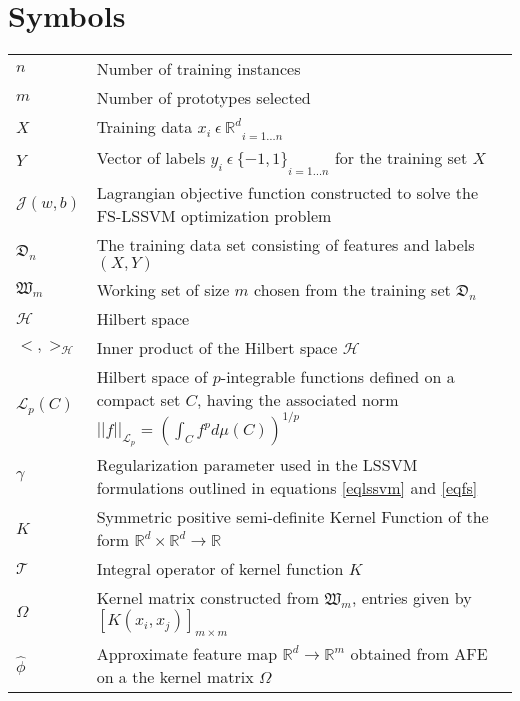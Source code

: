 \documentclass[master=mai,masteroption=ecs]{kulemt}
\begin{document}
\section*{Symbols}
\begin{flushleft}
  \renewcommand{\arraystretch}{1.1}
  \begin{tabularx}{\textwidth}{@{}p{12mm}X@{}}
    $n$ & Number of training instances\\
    $m$ & Number of prototypes selected\\
    $X $   & Training data ${x_i \ \epsilon \ \mathbb{R}^d}_{i = 1 \hdots n}$ \\
    $Y$   & Vector of labels ${y_i \ \epsilon \ \{-1, 1\}}_{i = 1 \hdots n}$ for the training set $X$ \\
    $\mathcal{J}(w,b)$ & Lagrangian objective function constructed to solve the FS-LSSVM optimization problem\\
    $\mathfrak{D}_n$ & The training data set consisting of features and labels $(X, Y)$\\
    $\mathfrak{W}_m$ & Working set of size $m$ chosen from the training set $\mathfrak{D}_n$\\
    $\mathcal{H}$ & Hilbert space\\
    $<,>_{\mathcal{H}}$ & Inner product of the Hilbert space $\mathcal{H}$\\
    $\mathcal{L}_p(C)$ & Hilbert space of $p$-integrable functions defined on a compact set $C$, having the associated norm $||f||_{\mathcal{L}_p} = (\int_{C}f^{p}d\mu(C))^{1/p}$\\
    $\gamma$ & Regularization parameter used in the LSSVM formulations outlined in equations \eqref{eqlssvm} and \eqref{eqfs}\\
    $K$ & Symmetric positive semi-definite Kernel Function of the form $\mathbb{R}^d \times \mathbb{R}^d \longrightarrow \mathbb{R}$ \\
    $\mathcal{T}$ & Integral operator of kernel function $K$\\
    $\Omega$ & Kernel matrix constructed from $\mathfrak{W}_m$, entries given by $[K(x_i, x_j)]_{m \times m}$\\
    
    $\hat{\phi}$ & Approximate feature map $\mathbb{R}^d \longrightarrow \mathbb{R}^m$ obtained from AFE on a the kernel matrix $\Omega$ \\
    

\end{tabularx}
\end{flushleft}
\end{document}
